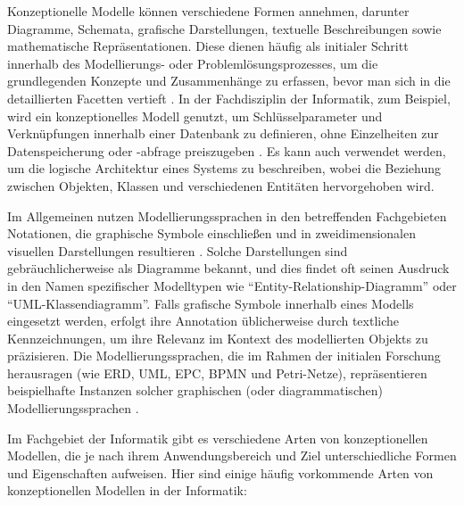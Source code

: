 Konzeptionelle Modelle können verschiedene Formen annehmen, darunter Diagramme, Schemata, grafische Darstellungen, textuelle Beschreibungen sowie mathematische Repräsentationen. Diese dienen häufig als initialer Schritt innerhalb des Modellierungs- oder Problemlösungsprozesses, um die grundlegenden Konzepte und Zusammenhänge zu erfassen, bevor man sich in die detaillierten Facetten vertieft \cite{abramowicz2013business}. In der Fachdisziplin der Informatik, zum Beispiel, wird ein konzeptionelles Modell genutzt, um Schlüsselparameter und Verknüpfungen innerhalb einer Datenbank zu definieren, ohne Einzelheiten zur Datenspeicherung oder -abfrage preiszugeben \cite{abramowicz2013business}. Es kann auch verwendet werden, um die logische Architektur eines Systems zu beschreiben, wobei die Beziehung zwischen Objekten, Klassen und verschiedenen Entitäten hervorgehoben wird.

Im Allgemeinen nutzen Modellierungssprachen in den betreffenden Fachgebieten Notationen, die graphische Symbole einschließen und in zweidimensionalen visuellen Darstellungen resultieren \cite{moody2009physics}. Solche Darstellungen sind gebräuchlicherweise als Diagramme bekannt, und dies findet oft seinen Ausdruck in den Namen spezifischer Modelltypen wie ``Entity-Relationship-Diagramm'' oder ``\ac{UML}-Klassendiagramm''. Falls grafische Symbole innerhalb eines Modells eingesetzt werden, erfolgt ihre Annotation üblicherweise durch textliche Kennzeichnungen, um ihre Relevanz im Kontext des modellierten Objekts zu präzisieren. Die Modellierungssprachen, die im Rahmen der initialen Forschung herausragen (wie ERD, UML, EPC, BPMN und Petri-Netze), repräsentieren beispielhafte Instanzen solcher graphischen (oder diagrammatischen) Modellierungssprachen \cite{ullrich2021automated}.

Im Fachgebiet der Informatik gibt es verschiedene Arten von konzeptionellen Modellen, die je nach ihrem Anwendungsbereich und Ziel unterschiedliche Formen und Eigenschaften aufweisen. Hier sind einige häufig vorkommende Arten von konzeptionellen Modellen in der Informatik:

